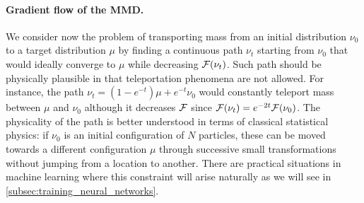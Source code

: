 \paragraph{Gradient flow of the MMD.}\label{paragraph:flow_MMD}
We consider now the problem of transporting mass from an initial distribution $\nu_0$ to a target distribution $\mu$ by finding a continuous path $\nu_t$ starting from $\nu_0$ that would ideally converge to $\mu$ while decreasing ${{\mathcal F}}(\nu_t)$. Such path should be physically plausible in that  teleportation phenomena are not allowed. For instance, the path $\nu_t = (1-e^{-t})\mu + e^{-t}\nu_0$ would constantly teleport mass between $\mu$ and $\nu_0$ although it decreases  ${{\mathcal F}}$ since ${{\mathcal F}}(\nu_t)=e^{-2t}{{\mathcal F}}(\nu_0)$. The physicality of the path is better understood in terms of classical statistical physics: if $\nu_0$ is an initial configuration of $N$ particles, these can be moved towards a different configuration $\mu$ through successive small transformations without jumping from a location to another. There are practical situations in machine learning where this constraint will arise naturally as we will see in \cref{subsec:training_neural_networks}. 

